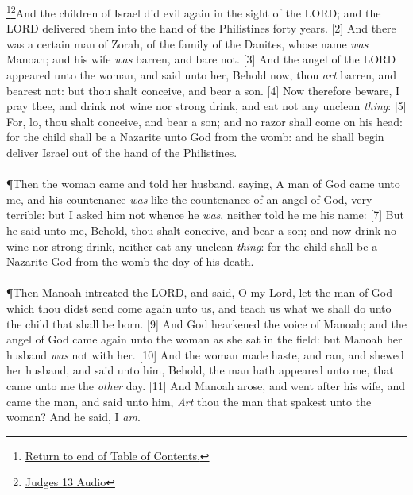 \footnote{\textcolor[rgb]{0.00,0.25,0.00}{\hyperlink{JudgesTOC}{Return to end of Table of Contents.}}}\footnote{\href{https://audiobible.com/bible/judges_13.html}{\textcolor[cmyk]{0.99998,1,0,0}{Judges 13 Audio}}}\textcolor[cmyk]{0.99998,1,0,0}{And the children of Israel did evil again in the sight of the LORD; and the LORD delivered them into the hand of the Philistines forty years.}
[2] \textcolor[cmyk]{0.99998,1,0,0}{And there was a certain man of Zorah, of the family of the Danites, whose name \emph{was} Manoah; and his wife \emph{was} barren, and bare not.}
[3] \textcolor[cmyk]{0.99998,1,0,0}{And the angel of the LORD appeared unto the woman, and said unto her, Behold now, thou \emph{art} barren, and bearest not: but thou shalt conceive, and bear a son.}
[4] \textcolor[cmyk]{0.99998,1,0,0}{Now therefore beware, I pray thee, and drink not wine nor strong drink, and eat not any unclean \emph{thing}:}
[5] \textcolor[cmyk]{0.99998,1,0,0}{For, lo, thou shalt conceive, and bear a son; and no razor shall come on his head: for the child shall be a Nazarite unto God from the womb: and he shall begin  deliver Israel out of the hand of the Philistines.}\\
\\
\P \textcolor[cmyk]{0.99998,1,0,0}{Then the woman came and told her husband, saying, A man of God came unto me, and his countenance \emph{was} like the countenance of an angel of God, very terrible: but I asked him not whence he \emph{was}, neither told he me his name:}
[7] \textcolor[cmyk]{0.99998,1,0,0}{But he said unto me, Behold, thou shalt conceive, and bear a son; and now drink no wine nor strong drink, neither eat any unclean \emph{thing}: for the child shall be a Nazarite  God from the womb  the day of his death.}\\
\\
\P \textcolor[cmyk]{0.99998,1,0,0}{Then Manoah intreated the LORD, and said, O my Lord, let the man of God which thou didst send come again unto us, and teach us what we shall do unto the child that shall be born.}
[9] \textcolor[cmyk]{0.99998,1,0,0}{And God hearkened  the voice of Manoah; and the angel of God came again unto the woman as she sat in the field: but Manoah her husband \emph{was} not with her.}
[10] \textcolor[cmyk]{0.99998,1,0,0}{And the woman made haste, and ran, and shewed her husband, and said unto him, Behold, the man hath appeared unto me, that came unto me the \emph{other} day.}
[11] \textcolor[cmyk]{0.99998,1,0,0}{And Manoah arose, and went after his wife, and came  the man, and said unto him, \emph{Art} thou the man that spakest unto the woman? And he said, I \emph{am}.}
